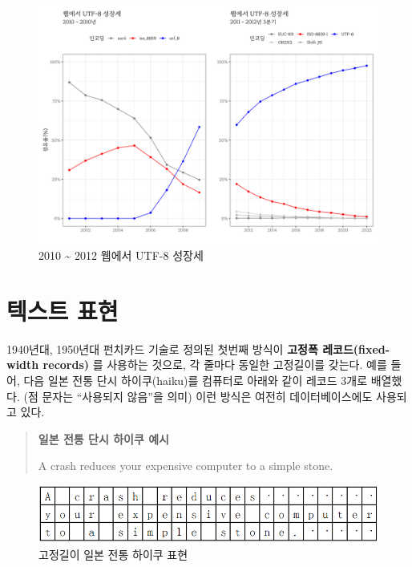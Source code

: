 \documentclass[
  letterpaper,
]{book}
\newenvironment{Shaded}{\begin{snugshade}}{\end{snugshade}}
\newcommand{\NormalTok}[1]{\textcolor[rgb]{0.00,0.23,0.31}{#1}}
\begin{document}
\begin{figure}

{\centering \includegraphics{images/encoding_utf_gg.jpg}

}

\caption{2010 \textasciitilde{} 2012 웹에서 UTF-8 성장세}

\end{figure}

\hypertarget{uxd14duxc2a4uxd2b8-uxd45cuxd604}{%
\section{텍스트 표현}\label{uxd14duxc2a4uxd2b8-uxd45cuxd604}}

1940년대, 1950년대 펀치카드 기술로 정의된 첫번째 방식이 \textbf{고정폭
레코드(fixed-width records)} 를 사용하는 것으로, 각 줄마다 동일한
고정길이를 갖는다. 예를 들어, 다음 일본 전통 단시 하이쿠(haiku)를
컴퓨터로 아래와 같이 레코드 3개로 배열했다. (점 문자는 ``사용되지
않음''을 의미) 이런 방식은 여전히 데이터베이스에도 사용되고 있다.

\begin{quote}
\textbf{일본 전통 단시 하이쿠 예시}

\begin{Shaded}
\begin{Highlighting}[]
\NormalTok{A crash reduces}
\NormalTok{your expensive computer}
\NormalTok{to a simple stone.}
\end{Highlighting}
\end{Shaded}
\end{quote}

\begin{figure}

{\centering \includegraphics{images/regex-encoding-fixed-width.png}

}

\caption{고정길이 일본 전통 하이쿠 표현}

\end{figure}
\end{document}
